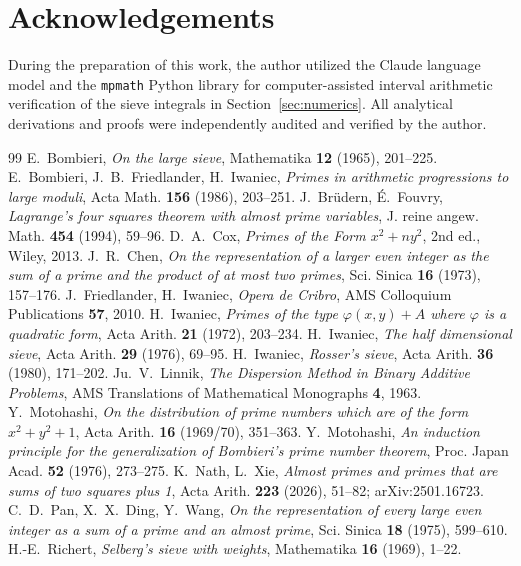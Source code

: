 \documentclass[11pt]{amsart}
\theoremstyle{remark}
\begin{document}
\section*{Acknowledgements}
During the preparation of this work, the author utilized the Claude language model and the
\texttt{mpmath} Python library for computer-assisted interval arithmetic verification of the sieve
integrals in Section~\ref{sec:numerics}. All analytical derivations and proofs were independently audited
and verified by the author.

\begin{thebibliography}{99}
 E.~Bombieri, \emph{On the large sieve}, Mathematika \textbf{12} (1965), 201--225.
 E.~Bombieri, J.~B.~Friedlander, H.~Iwaniec, \emph{Primes in arithmetic progressions to large
moduli}, Acta Math. \textbf{156} (1986), 203--251.
 J.~Br\"udern, \'E.~Fouvry, \emph{Lagrange's four squares theorem with almost prime variables},
J. reine angew. Math. \textbf{454} (1994), 59--96.
 D.~A.~Cox, \emph{Primes of the Form $x^2+ny^2$}, 2nd ed., Wiley, 2013.
 J.~R.~Chen, \emph{On the representation of a larger even integer as the sum of a prime and
the product of at most two primes}, Sci. Sinica \textbf{16} (1973), 157--176.
 J.~Friedlander, H.~Iwaniec, \emph{Opera de Cribro}, AMS Colloquium Publications \textbf{57},
2010.
 H.~Iwaniec, \emph{Primes of the type $\varphi(x,y)+A$ where $\varphi$ is a quadratic
form}, Acta Arith. \textbf{21} (1972), 203--234.
 H.~Iwaniec, \emph{The half dimensional sieve}, Acta Arith. \textbf{29} (1976),
69--95.
 H.~Iwaniec, \emph{Rosser's sieve}, Acta Arith. \textbf{36} (1980), 171--202.
 Ju.~V.~Linnik, \emph{The Dispersion Method in Binary Additive Problems}, AMS
Translations of Mathematical Monographs \textbf{4}, 1963.
 Y.~Motohashi, \emph{On the distribution of prime numbers which are of the form
$x^2+y^2+1$}, Acta Arith. \textbf{16} (1969/70), 351--363.
 Y.~Motohashi, \emph{An induction principle for the generalization of Bombieri's prime
number theorem}, Proc. Japan Acad. \textbf{52} (1976), 273--275.
 K.~Nath, L.~Xie, \emph{Almost primes and primes that are sums of two squares plus 1},
Acta Arith. \textbf{223} (2026), 51--82; arXiv:2501.16723.
 C.~D.~Pan, X.~X.~Ding, Y.~Wang, \emph{On the representation of every large even integer as a
sum of a prime and an almost prime}, Sci. Sinica \textbf{18} (1975), 599--610.
 H.-E.~Richert, \emph{Selberg's sieve with weights}, Mathematika \textbf{16} (1969), 1--22.
\end{thebibliography}
\end{document}

